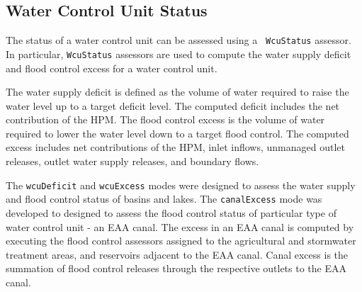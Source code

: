 \subsection{Water Control Unit Status}

The status of a water control unit can be assessed using a {\tt
  WcuStatus} assessor.  In particular, {\tt WcuStatus} assessors are
used to compute the water supply deficit and flood control excess for
a water control unit.

The water supply deficit is defined as the volume of water required to
raise the water level up to a target deficit level.  The computed
deficit includes the net contribution of the HPM.  The flood control
excess is the volume of water required to lower the water level down
to a target flood control.  The computed excess includes net
contributions of the HPM, inlet inflows, unmanaged outlet releases,
outlet water supply releases, and boundary flows.  

The {\tt wcuDeficit} and {\tt wcuExcess} modes were designed to assess
the water supply and flood control status of basins and lakes.  The
{\tt canalExcess} mode was developed to designed to assess the flood
control status of particular type of water control unit \-- an EAA
canal.  The excess in an EAA canal is computed by executing the flood
control assessors assigned to the agricultural and stormwater
treatment areas, and reservoirs adjacent to the EAA canal.  Canal
excess is the summation of flood control releases through the
respective outlets to the EAA canal.  
